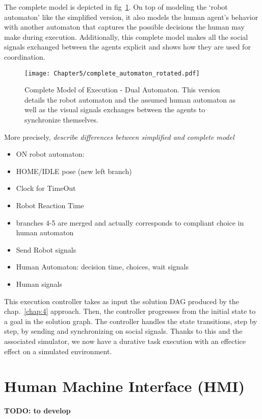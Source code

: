 The complete model is depicted in fig~\ref{fig:complete_model_exec}. On top of modeling the `robot automaton' like the simplified version, it also models the human agent's behavior with another automaton that captures the possible decisions the human may make during execution. Additionally, this complete model makes all the social signals exchanged between the agents explicit and shows how they are used for coordination.  


\begin{figure}
    \centering
    \texttt{[image: Chapter5/complete\_automaton\_rotated.pdf]}
    \caption{Complete Model of Execution - Dual Automaton. This version details the robot automaton and the assumed human automaton as well as the visual signals exchanges between the agents to synchronize themselves.}
    \label{fig:complete_model_exec}
\end{figure}

More precisely, \textit{describe differences between simplified and complete model}
\begin{itemize}
    \item ON robot automaton:
    \item HOME/IDLE pose (new left branch)
    \item Clock for TimeOut
    \item Robot Reaction Time
    \item branches 4-5 are merged and actually corresponds to compliant choice in human automaton
    \item Send Robot signals 
    \item Human Automaton: decision time, choices, wait signals
    \item Human signals
\end{itemize}

This execution controller takes as input the solution DAG produced by the chap.~\ref{chap:4} approach. Then, the controller progresses from the initial state to a goal in the solution graph. The controller handles the state transitions, step by step, by sending and synchronizing on social signals. Thanks to this and the associated simulator, we now have a durative task execution with an effectice effect on a simulated environment.


\section{Human Machine Interface (HMI)}

\textbf{TODO: to develop}

